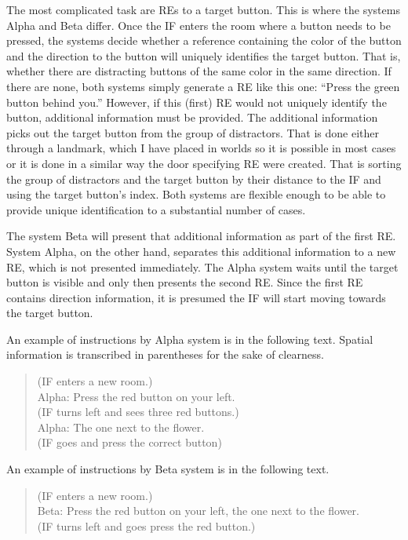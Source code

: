 The most complicated task are REs to a target button. This is where the systems Alpha and Beta differ. Once the IF enters the room where a button needs to be pressed, the systems decide whether a reference containing the color of the button and the direction to the button will uniquely identifies the target button. That is, whether there are distracting buttons of the same color in the same direction. If there are none, both systems simply generate a RE like this one: ``Press the green button behind you.'' However, if this (first) RE would not uniquely identify the button, additional information must be provided. The additional information picks out the target button from the group of distractors. That is done either through a landmark, which I have placed in worlds so it is possible in most cases or it is done in a similar way the door specifying RE were created. That is sorting the group of distractors and the target button by their distance to the IF and using the target button's index. Both systems are flexible enough to be able to provide unique identification to a substantial number of cases.

The system Beta will present that additional information as part of the first RE. System Alpha, on the other hand, separates this additional information to a new RE, which is not presented immediately. The Alpha system waits until the target button is visible and only then presents the second RE. Since the first RE contains direction information, it is presumed the IF will start moving towards the target button.

An example of instructions by Alpha system is in the following text. Spatial information is transcribed in parentheses for the sake of clearness.

\begin{verse}
(IF enters a new room.)\\
Alpha: Press the red button on your left.\\
(IF turns left and sees three red buttons.)\\
Alpha: The one next to the flower.\\
(IF goes and press the correct button)\\
\end{verse}

An example of instructions by Beta system is in the following text. 

\begin{verse}
(IF enters a new room.)\\
Beta: Press the red button on your left, the one next to the flower.\\
(IF turns left and goes press the red button.)\\
\end{verse}

